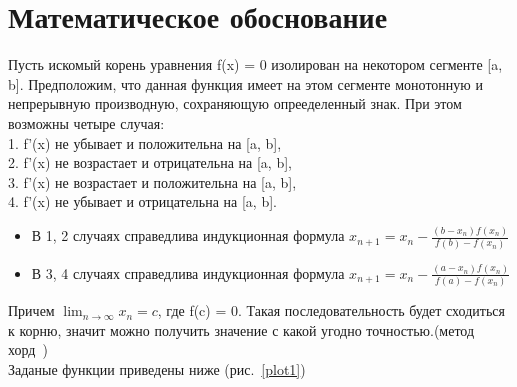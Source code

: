 \documentclass[a4paper,12pt,titlepage,finall]{article}
\begin{document}
\newpage

\section{Математическое обоснование}

Пусть искомый корень уравнения f(x) = 0 изолирован на некотором сегменте [a, b]. Предположим, что данная функция имеет на этом сегменте монотонную и непрерывную производную, сохраняющую опрееделенный знак. При этом возможны четыре случая:\\
1. f'(x) не убывает и положительна на [a, b], \\
2. f'(x) не возрастает и отрицательна на [a, b], \\
3. f'(x) не возрастает и положительна на [a, b], \\
4. f'(x) не убывает и отрицательна на [a, b].
\begin{itemize}
\item В  1, 2 случаях справедлива индукционная формула {$x_{n+1} = x_n - \frac{(b - x_n)f(x_n)}{f(b)-f(x_n)}$}
\item В 3, 4 случаях справедлива индукционная формула  {$x_{n+1} = x_n - \frac{(a - x_n)f(x_n)}{f(a)-f(x_n)}$}
\end{itemize}
Причем {$\lim_{n \to \infty} x_n = c$}, где f(c) = 0. Такая последовательность будет сходиться к корню, значит можно получить значение с какой угодно точностью.(метод хорд~\cite{math})\\
Заданые функции приведены ниже (рис.~\ref{plot1})
\end{document}

